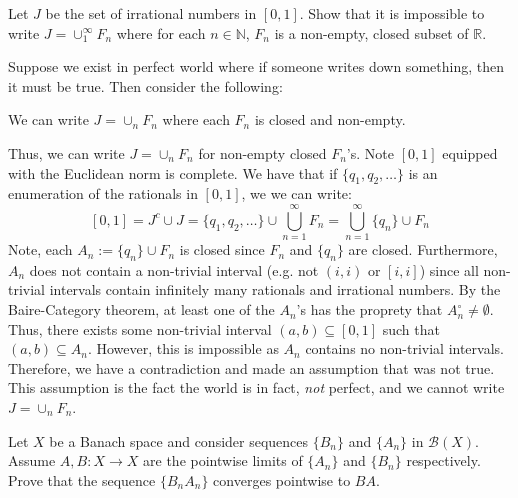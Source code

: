 \documentclass{article}
\begin{document}
    \newpage
    \begin{Exercise}
        Let $J$ be the set of irrational numbers in $[0,1]$. Show that it is impossible to write $J = \cup_1^{\infty} F_n$ where for each
        $n\in\mathbb{N}$, $F_n$ is a non-empty, closed subset of $\mathbb{R}$.
    \end{Exercise}

    \begin{Answer}
        Suppose we exist in perfect world where if someone writes down something, then it must be true. Then consider the following:
        \begin{displayquote}
            We can write $J = \cup_n F_n$ where each $F_n$ is closed and non-empty.
        \end{displayquote}
        Thus, we can write $J = \cup_n F_n$ for non-empty closed $F_n$'s. 
        Note $[0,1]$ equipped with the Euclidean norm is complete. We have that if $\{q_1,q_2,\hdots\}$ is an enumeration of the rationals
        in $[0,1]$, we we can write:
        \[ [0,1] = J^c \cup J = \{q_1,q_2,\hdots\} \cup \bigcup_{n=1}^{\infty} F_n = \bigcup_{n=1}^{\infty} \{q_n\} \cup F_n \]
        Note, each $A_n := \{q_n\}\cup F_n$ is closed since $F_n$ and $\{q_n\}$ are closed. Furthermore, $A_n$ does not contain a non-trivial
        interval (e.g. not $(i,i)$ or $[i,i]$) since all non-trivial intervals contain infinitely many rationals and irrational numbers. By
        the Baire-Category theorem, at least one of the $A_n$'s has the proprety that $A_n^{\circ}\neq \emptyset$. Thus, there exists some
        non-trivial interval $(a,b)\subseteq[0,1]$ such that $(a,b)\subseteq A_n$. However, this is impossible as $A_n$ contains no non-trivial
        intervals. Therefore, we have a contradiction and made an assumption that was not true. This assumption is the fact the world is
        in fact, \textit{not} perfect, and we cannot write $J = \cup_n F_n$.
    \end{Answer}

    \newpage
    \begin{Exercise}
        Let $X$ be a Banach space and consider sequences $\{B_n\}$ and $\{A_n\}$ in $\mathscr{B}(X)$. Assume $A,B:X\to X$ are the pointwise
        limits of $\{A_n\}$ and $\{B_n\}$ respectively. Prove that the sequence $\{B_nA_n\}$ converges pointwise to $BA$.
    \end{Exercise}
\end{document}
